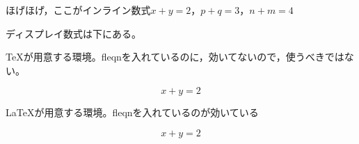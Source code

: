 \documentclass[b5j,10pt,twoside,autodetect-engine,dvipdfmx,fleqn]{jsarticle}
\begin{document}
ほげほげ，ここがインライン数式$x+y=2$，\(p+q=3\)，\begin{math}n+m=4\end{math}

ディスプレイ数式は下にある。

\TeX が用意する環境。fleqnを入れているのに，効いてないので，使うべきではない。

$$
x+y=2
$$

\LaTeX が用意する環境。fleqnを入れているのが効いている

\[ 
x+y=2
\]
\end{document}
